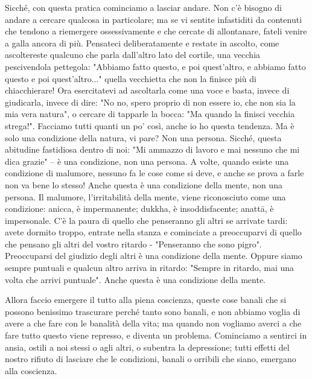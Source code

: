 Sicché, con questa pratica cominciamo a lasciar andare. Non c'è bisogno
di andare a cercare qualcosa in particolare; ma se vi sentite
infastiditi da contenuti che tendono a riemergere ossessivamente e che
cercate di allontanare, fateli venire a galla ancora di più. Pensateci
deliberatamente e restate in ascolto, come ascoltereste qualcuno che
parla dall'altro lato del cortile, una vecchia pescivendola pettegola:
"Abbiamo fatto questo, e poi quest'altro, e abbiamo fatto questo e poi
quest'altro..." quella vecchietta che non la finisce più di
chiacchierare! Ora esercitatevi ad ascoltarla come una voce e basta,
invece di giudicarla, invece di dire: "No no, spero proprio di non
essere io, che non sia la mia vera natura", o cercare di tapparle la
bocca: "Ma quando la finisci vecchia strega!". Facciamo tutti quanti un
po' così, anche io ho questa tendenza. Ma è solo una condizione della
natura, vi pare? Non una persona. Sicché, questa abitudine fastidiosa
dentro di noi: "Mi ammazzo di lavoro e mai nessuno che mi dica grazie" –
è una condizione, non una persona. A volte, quando esiste una condizione
di malumore, nessuno fa le cose come si deve, e anche se prova a farle
non va bene lo stesso! Anche questa è una condizione della mente, non
una persona. Il malumore, l'irritabilità della mente, viene riconosciuto
come una condizione: anicca, è impermanente; dukkha, è insoddisfacente;
anattā, è impersonale. C'è la paura di quello che penseranno gli altri
se arrivate tardi: avete dormito troppo, entrate nella stanza e
cominciate a preoccuparvi di quello che pensano gli altri del vostro
ritardo - "Penseranno che sono pigro". Preoccuparsi del giudizio degli
altri è una condizione della mente. Oppure siamo sempre puntuali e
qualcun altro arriva in ritardo: "Sempre in ritardo, mai una volta che
arrivi puntuale". Anche questa è una condizione della mente.

Allora faccio emergere il tutto alla piena coscienza, queste cose banali
che si possono benissimo trascurare perché tanto sono banali, e non
abbiamo voglia di avere a che fare con le banalità della vita; ma quando
non vogliamo averci a che fare tutto questo viene represso, e diventa un
problema. Cominciamo a sentirci in ansia, ostili a noi stessi o agli
altri, o subentra la depressione; tutti effetti del nostro rifiuto di
lasciare che le condizioni, banali o orribili che siano, emergano alla
coscienza.

